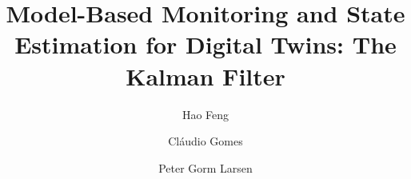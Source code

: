 \documentclass{article}
\begin{document}
\title{Model-Based Monitoring and State Estimation for Digital Twins: The Kalman Filter}


\author[$\dagger$]{Hao Feng}
\author[$\dagger$]{Cláudio Gomes}
\author[$\dagger$]{Peter Gorm Larsen}


\maketitle













% 





%
\end{document}
